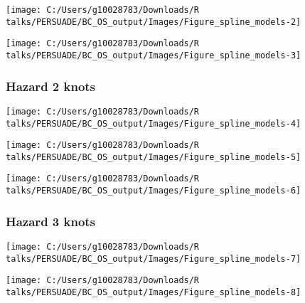 \documentclass[
]{article}
\begin{document}
\begin{flushleft}\texttt{[image: C:/Users/g10028783/Downloads/R talks/PERSUADE/BC\_OS\_output/Images/Figure\_spline\_models-2]} \end{flushleft}

\begin{flushleft}\texttt{[image: C:/Users/g10028783/Downloads/R talks/PERSUADE/BC\_OS\_output/Images/Figure\_spline\_models-3]} \end{flushleft}

\clearpage

\subsubsection{Hazard 2 knots}\label{hazard-2-knots}

\begin{flushleft}\texttt{[image: C:/Users/g10028783/Downloads/R talks/PERSUADE/BC\_OS\_output/Images/Figure\_spline\_models-4]} \end{flushleft}

\begin{flushleft}\texttt{[image: C:/Users/g10028783/Downloads/R talks/PERSUADE/BC\_OS\_output/Images/Figure\_spline\_models-5]} \end{flushleft}

\begin{flushleft}\texttt{[image: C:/Users/g10028783/Downloads/R talks/PERSUADE/BC\_OS\_output/Images/Figure\_spline\_models-6]} \end{flushleft}

\clearpage

\subsubsection{Hazard 3 knots}\label{hazard-3-knots}

\begin{flushleft}\texttt{[image: C:/Users/g10028783/Downloads/R talks/PERSUADE/BC\_OS\_output/Images/Figure\_spline\_models-7]} \end{flushleft}

\begin{flushleft}\texttt{[image: C:/Users/g10028783/Downloads/R talks/PERSUADE/BC\_OS\_output/Images/Figure\_spline\_models-8]} \end{flushleft}
\end{document}

